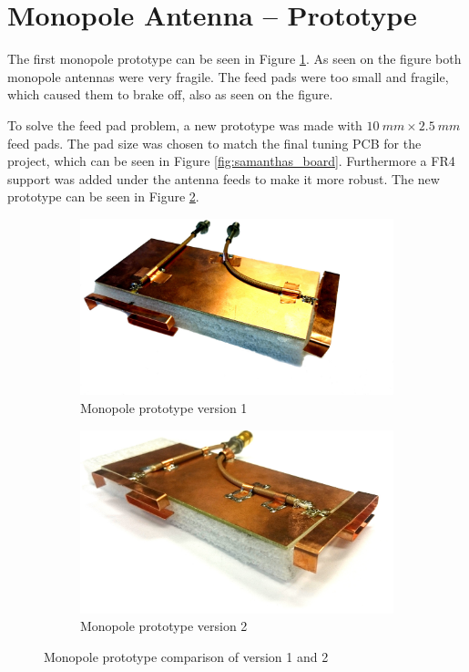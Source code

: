 \section{Monopole Antenna -- Prototype}
The first monopole prototype can be seen in Figure \ref{fig:ant1_proto1_3d}. As seen on the figure both monopole antennas were very fragile. The feed pads were too small and fragile, which caused them to brake off, also as seen on the figure.

To solve the feed pad problem, a new prototype was made with $\SI{10}{mm}\times \SI{2.5}{mm}$ feed pads. The pad size was chosen to match the final tuning PCB for the project, which can be seen in Figure \ref{fig:samanthas_board}. Furthermore a FR4 support was added under the antenna feeds to make it more robust. The new prototype can be seen in Figure \ref{fig:ant1_proto2_3d}.

\begin{figure}[htbp]
  \begin{subfigure}[b]{0.49\linewidth}
        \centering
        \includegraphics[scale=0.2]{img/tech_sol/monopole/prototype_v1/monopole_v1}
        \caption{Monopole prototype version 1}
        \label{fig:ant1_proto1_3d}
    \end{subfigure}
    \hfill
    \begin{subfigure}[b]{0.49\linewidth}
        \centering
        \includegraphics[scale=0.27]{img/tech_sol/monopole/prototype_v2/monopole_v2}
        \caption{Monopole prototype version 2}
        \label{fig:ant1_proto2_3d}
    \end{subfigure}
    \caption{Monopole prototype comparison of version 1 and 2}
    \label{fig:ant_1_proto_3d}
\end{figure}

